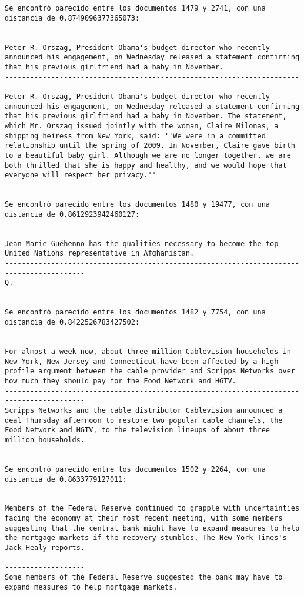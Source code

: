 \documentclass[11pt]{article}
\begin{document}
\begin{Verbatim}[commandchars=\\\{\}]
Se encontró parecido entre los documentos 1479 y 2741, con una distancia de 0.8749096377365073:


Peter R. Orszag, President Obama's budget director who recently announced his engagement, on Wednesday released a statement confirming that his previous girlfriend had a baby in November.
-----------------------------------------------------------------------------------------
Peter R. Orszag, President Obama's budget director who recently announced his engagement, on Wednesday released a statement confirming that his previous girlfriend had a baby in November. The statement, which Mr. Orszag issued jointly with the woman, Claire Milonas, a shipping heiress from New York, said: ''We were in a committed relationship until the spring of 2009. In November, Claire gave birth to a beautiful baby girl. Although we are no longer together, we are both thrilled that she is happy and healthy, and we would hope that everyone will respect her privacy.''


Se encontró parecido entre los documentos 1480 y 19477, con una distancia de 0.8612923942460127:


Jean-Marie Guéhenno has the qualities necessary to become the top United Nations representative in Afghanistan.
-----------------------------------------------------------------------------------------
Q.


Se encontró parecido entre los documentos 1482 y 7754, con una distancia de 0.8422526783427502:


For almost a week now, about three million Cablevision households in New York, New Jersey and Connecticut have been affected by a high-profile argument between the cable provider and Scripps Networks over how much they should pay for the Food Network and HGTV.
-----------------------------------------------------------------------------------------
Scripps Networks and the cable distributor Cablevision announced a deal Thursday afternoon to restore two popular cable channels, the Food Network and HGTV, to the television lineups of about three million households.


Se encontró parecido entre los documentos 1502 y 2264, con una distancia de 0.8633779127011:


Members of the Federal Reserve continued to grapple with uncertainties facing the economy at their most recent meeting, with some members suggesting that the central bank might have to expand measures to help the mortgage markets if the recovery stumbles, The New York Times's Jack Healy reports.
-----------------------------------------------------------------------------------------
Some members of the Federal Reserve suggested the bank may have to expand measures to help mortgage markets.



\end{Verbatim}
\end{document}
